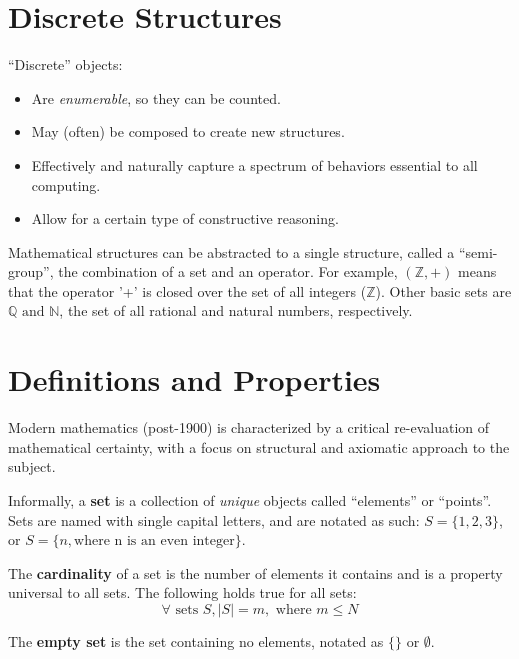 \documentclass[11pt]{article}
\begin{document}
\section{Discrete Structures}
	``Discrete'' objects:
	\begin{itemize}
		\item Are \textit{enumerable}, so they can be counted.
		\item May (often) be composed to create new structures.
		\item Effectively and naturally capture a spectrum of behaviors essential to all computing.
		\item Allow for a certain type of constructive reasoning.
	\end{itemize}
	
	Mathematical structures can be abstracted to a single structure, called a ``semi-group'', the combination of a set and an operator. For example, $(\mathbb{Z}, +)$ means that the operator '+' is closed over the set of all integers ($\mathbb{Z}$). Other basic sets are $\mathbb{Q} \text{ and } \mathbb{N}$, the set of all rational and natural numbers, respectively.
	
\section{Definitions and Properties}
	Modern mathematics (post-1900) is characterized by a critical re-evaluation of mathematical certainty, with a focus on structural and axiomatic approach to the subject.
	
	Informally, a \textbf{set} is a collection of \textit{unique} objects called ``elements'' or ``points''. Sets are named with single capital letters, and are notated as such: $S=\{1,2,3\}$, or $S = \{n, \text{where n is an even integer}\}$.
	
	The \textbf{cardinality} of a set is the number of elements it contains and is a property universal to all sets. The following holds true for all sets:
	\begin{equation}
		\forall \text{ sets } S, |S|=m, \text{ where } m\leq N
	\end{equation}
	
	The \textbf{empty set} is the set containing no elements, notated as $\{\}$ or $\emptyset$.

%		
%		


\end{document}
